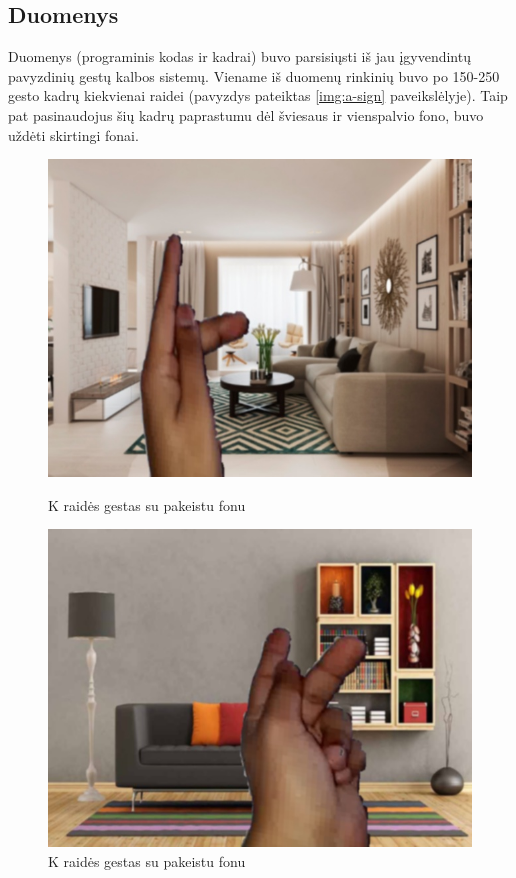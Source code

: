 \documentclass{VUMIFInfKursinis}
\begin{document}
\subsection{Duomenys}
Duomenys (programinis kodas ir kadrai) buvo parsisiųsti iš jau įgyvendintų pavyzdinių gestų kalbos sistemų. Viename iš duomenų rinkinių buvo po 150-250 gesto kadrų kiekvienai raidei (pavyzdys pateiktas \ref{img:a-sign} paveikslėlyje). Taip pat pasinaudojus šių kadrų paprastumu dėl šviesaus ir vienspalvio fono, buvo uždėti skirtingi fonai.

\begin{figure}[H]
	\begin{minipage}{.5\textwidth}
		\centering
		\includegraphics[width=.8\linewidth]{img/K1}
		\caption{K raidės gestas su pakeistu fonu}
		\label{img:a-sign-first}
	\end{minipage}\hspace{\fill}%
	\begin{minipage}{.5\textwidth}
		\centering
		\includegraphics[width=.8\linewidth]{img/K2}
		\caption{K raidės gestas su pakeistu fonu}
		\label{img:a-sign-second}
	\end{minipage}\hspace{\fill}%
\end{figure}
\end{document}
